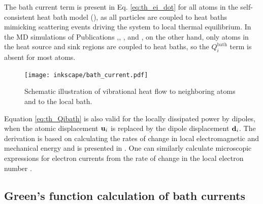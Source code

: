 The bath current term is present in Eq. \eqref{eq:th_ei_dot} for all atoms in the self-consistent heat bath model (), as all particles are coupled to heat baths mimicking scattering events driving the system to local thermal equilibrium. In the MD simulations of Publications ,, , and , on the other hand, only atoms in the heat source and sink regions are coupled to heat baths, so the $Q_i^{\textrm{bath}}$ term is absent for most atoms. 

\begin{figure}
 \begin{center}
 \texttt{[image: inkscape/bath\_current.pdf]}
 \end{center}
 \caption{Schematic illustration of vibrational heat flow to neighboring atoms and to the local bath.}
 \label{fig:vib_currents}
\end{figure}

Equation \eqref{eq:th_Qibath} is also valid for the locally dissipated power by dipoles, when the atomic displacement $\mathbf{u}_i$ is replaced by the dipole displacement $\mathbf{d}_i$. The derivation is based on calculating the rates of change in local electromagnetic and mechanical energy and is presented in . One can similarly calculate microscopic expressions for electron currents from the rate of change in the local electron number \cite{roy07}. 

\subsection{Green's function calculation of bath currents}
\label{sec:th_bathcurrents}

